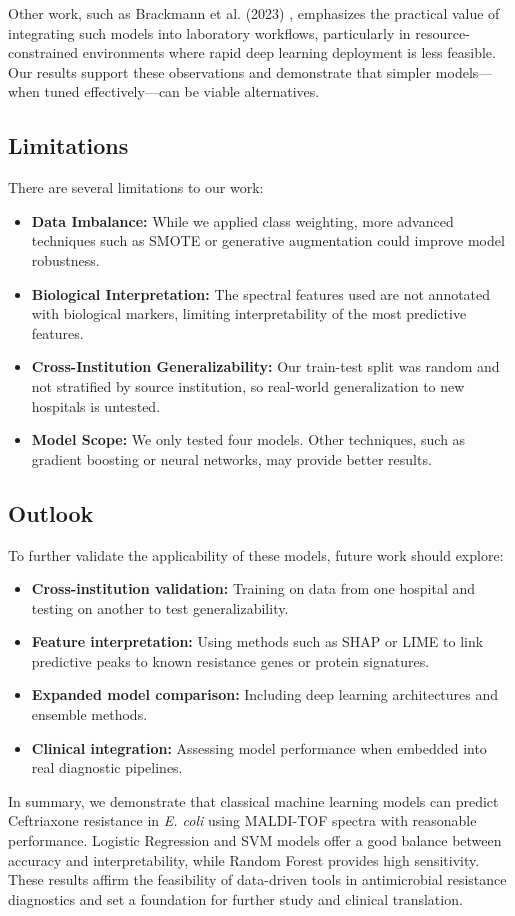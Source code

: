 \documentclass{article}
\begin{document}
Other work, such as Brackmann et al. (2023) \citep{doi:10.1093/cid/ciad080}, emphasizes the practical value of integrating such models into laboratory workflows, particularly in resource-constrained environments where rapid deep learning deployment is less feasible. Our results support these observations and demonstrate that simpler models—when tuned effectively—can be viable alternatives.

\subsection*{Limitations}
There are several limitations to our work:
\begin{itemize}
    \item \textbf{Data Imbalance:} While we applied class weighting, more advanced techniques such as SMOTE or generative augmentation could improve model robustness.
    \item \textbf{Biological Interpretation:} The spectral features used are not annotated with biological markers, limiting interpretability of the most predictive features.
    \item \textbf{Cross-Institution Generalizability:} Our train-test split was random and not stratified by source institution, so real-world generalization to new hospitals is untested.
    \item \textbf{Model Scope:} We only tested four models. Other techniques, such as gradient boosting or neural networks, may provide better results.
\end{itemize}

\subsection*{Outlook}
To further validate the applicability of these models, future work should explore:
\begin{itemize}
    \item \textbf{Cross-institution validation:} Training on data from one hospital and testing on another to test generalizability.
    \item \textbf{Feature interpretation:} Using methods such as SHAP or LIME to link predictive peaks to known resistance genes or protein signatures.
    \item \textbf{Expanded model comparison:} Including deep learning architectures and ensemble methods.
    \item \textbf{Clinical integration:} Assessing model performance when embedded into real diagnostic pipelines.
\end{itemize}

In summary, we demonstrate that classical machine learning models can predict Ceftriaxone resistance in \textit{E. coli} using MALDI-TOF spectra with reasonable performance. Logistic Regression and SVM models offer a good balance between accuracy and interpretability, while Random Forest provides high sensitivity. These results affirm the feasibility of data-driven tools in antimicrobial resistance diagnostics and set a foundation for further study and clinical translation.





\end{document}
